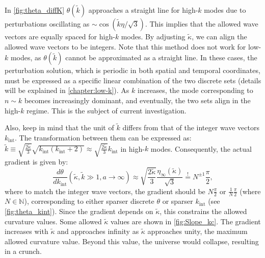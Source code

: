 In \cref{fig:theta_diffK} \(\theta(\tilde{k})\) approaches a straight line for high-\(k\) modes due to perturbations oscillating as \(\sim \cos(\tilde{k}\eta/\sqrt{3})\).
This implies that the allowed wave vectors are equally spaced for high-\(k\) modes. By adjusting \(\tilde{\kappa}\), we can align the allowed wave vectors to be integers. 
Note that this method does not work for low-\(k\) modes, as \(\theta(\tilde{k})\) cannot be approximated as a straight line. In these cases, the perturbation solution, which is periodic in both spatial and temporal coordinates, must be expressed as a specific linear combination of the two discrete sets (details will be explained in \cref{chapter:low-k}). As \(k\) increases, the mode corresponding to \(n \sim k\) becomes increasingly dominant, and eventually, the two sets align in the high-\(k\) regime. This is the subject of current investigation.

Also, keep in mind that the unit of \(\tilde{k}\) differs from that of the integer wave vectors \(k_{\text{int}}\). The transformation between them can be expressed as: \(\tilde{k}\equiv  \sqrt{\frac{2\tilde{\kappa}}{3}} \sqrt{k_{\text{int}}(k_{\text{int}}+2) }  \approx \sqrt{\frac{2\tilde{\kappa}}{3}} k_{\text{int}}\) in high-\(k\) modes. Consequently, the actual gradient is given by:
\begin{equation}
\frac{d\theta}{dk_{\text{int}}}(\tilde{\kappa},\tilde{k}\gg 1,a\rightarrow \infty) \approx \sqrt{\frac{2\tilde{\kappa}}{3}}\frac{\eta_{\infty}(\tilde{\kappa})}{\sqrt{3}} \overset{!}{=} N^{\pm 1}\frac{\pi}{2},
\end{equation}
where to match the integer wave vectors, the gradient should be \(N\frac{\pi}{2}\) or \(\frac{1}{N}\frac{\pi}{2}\) (where \(N\in\mathbb{N}\)), corresponding to either sparser discrete \(\theta\) or sparser \(k_{\text{int}}\) (see \cref{fig:theta_kint}). Since the gradient depends on \(\tilde{\kappa}\), this constrains the allowed curvature values. Some allowed \(\tilde{\kappa}\) values are shown in \cref{fig:Slope_kc}. The gradient increases with \(\tilde{\kappa}\) and approaches infinity as \(\tilde{\kappa}\) approaches unity, the maximum allowed curvature value. Beyond this value, the universe would collapse, resulting in a crunch. 



